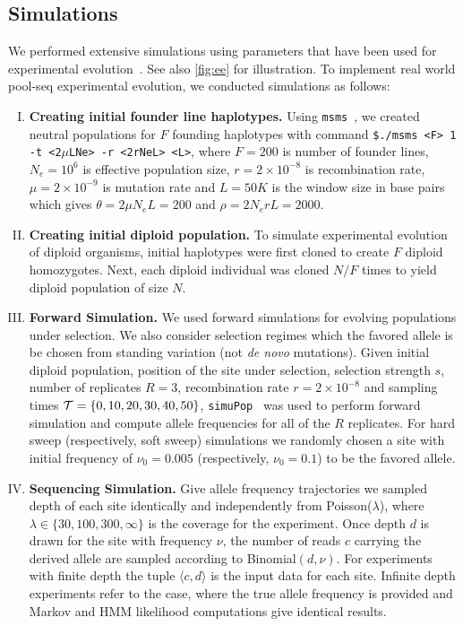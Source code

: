 \subsection{Simulations}
We performed extensive simulations using parameters that have been
used for \dmel experimental
evolution~\cite{kofler2013guide}. See also \ref{fig:ee} 
for
illustration. To implement real world pool-seq experimental evolution, we 
conducted simulations as follows:
\begin{enumerate}[I.]
\item {\bf Creating initial founder line haplotypes.} Using
  \texttt{msms}~\cite{ewing2010msms}, we created neutral populations for $F$
  founding haplotypes with command \texttt{\$./msms
    <F> 1 -t <2$\mu$LNe> -r <2rNeL> <L>}, where $F=200$ is number of
  founder lines, $N_e=10^6$ is effective population size,
  $r=2\times10^{-8}$ is recombination rate, $\mu=2\times 10^{-9}$ is
  mutation rate and $L=50K$ is the window size in base pairs which
  gives $\theta=2\mu N_eL=200$ and $\rho=2N_erL=2000$.
  
\item{\bf Creating initial diploid population.} To simulate
  experimental evolution of diploid organisms, initial haplotypes were
  first cloned to create $F$ diploid homozygotes. Next, each diploid
  individual was cloned $N/F$ times to yield diploid population of
  size $N$.

\item{\bf Forward Simulation.} We used forward simulations for
  evolving populations under selection. We also consider selection
  regimes which the favored allele is be chosen from standing
  variation (not \emph{de novo} mutations). Given initial diploid
  population, position of the site under selection, selection strength
  $s$, number of replicates $R=3$, recombination rate
  $r=2\times10^{-8}$ and sampling times ${\cal T}=\{0,10,20,30,40,50\}$,
  \texttt{simuPop}~\cite{peng2005simupop} was used to perform forward
  simulation and compute allele frequencies for all of the $R$
  replicates.  For hard sweep (respectively, soft sweep) simulations
  we randomly chosen a site with initial frequency of $\nu_0=0.005$
  (respectively, $\nu_0=0.1$) to be the favored allele.
\item{\bf Sequencing Simulation.} Give allele frequency trajectories
  we sampled depth of each site identically and independently from
  Poisson($\lambda$), where $\lambda \in \{30,100,300,\infty\}$ is the
  coverage for the experiment. Once depth $d$ is drawn for the site
  with frequency $\nu$, the number of reads $c$ carrying the derived
  allele are sampled according to Binomial$(d,\nu)$. For experiments
  with finite depth the tuple $\langle c,d\rangle$ is the input data
  for each site. Infinite depth experiments refer to the case, where
  the true allele frequency is provided and Markov and HMM likelihood
  computations give identical results.
\end{enumerate}
